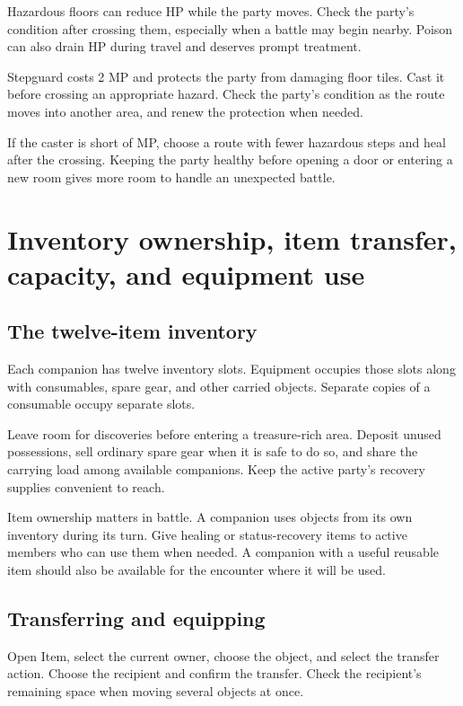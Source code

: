 Hazardous floors can reduce HP while the party moves. Check the party's
condition after crossing them, especially when a battle may begin nearby.
Poison can also drain HP during travel and deserves prompt treatment.

Stepguard costs 2 MP and protects the party from damaging floor tiles.
Cast it before crossing an appropriate hazard. Check the party's condition
as the route moves into another area, and renew the protection when needed.

If the caster is short of MP, choose a route with fewer hazardous steps
and heal after the crossing. Keeping the party healthy before opening a
door or entering a new room gives more room to handle an unexpected battle.

\section{Inventory ownership, item transfer, capacity, and equipment use}

\subsection*{The twelve-item inventory}

Each companion has twelve inventory slots. Equipment occupies those
slots along with consumables, spare gear, and other carried objects.
Separate copies of a consumable occupy separate slots.

Leave room for discoveries before entering a treasure-rich area. Deposit
unused possessions, sell ordinary spare gear when it is safe to do so,
and share the carrying load among available companions. Keep the active
party's recovery supplies convenient to reach.

Item ownership matters in battle. A companion uses objects from its own
inventory during its turn. Give healing or status-recovery items to active
members who can use them when needed. A companion with a useful reusable
item should also be available for the encounter where it will be used.

\subsection*{Transferring and equipping}

Open Item, select the current owner, choose the object, and select the
transfer action. Choose the recipient and confirm the transfer. Check
the recipient's remaining space when moving several objects at once.

